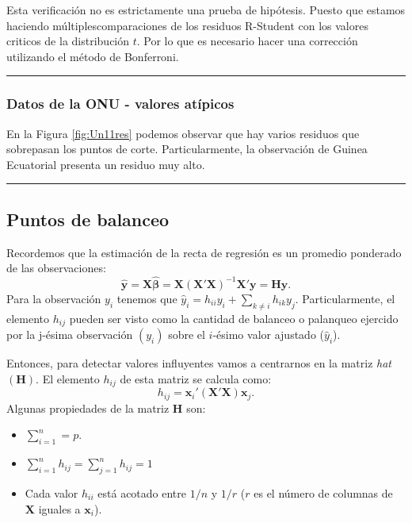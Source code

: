 \documentclass[
]{article}
\begin{document}
Esta verificación no es estrictamente una prueba de hipótesis. Puesto que estamos haciendo múltiplescomparaciones de los residuos R-Student con los valores criticos de la distribución \(t\). Por lo que es necesario hacer una corrección utilizando el método de Bonferroni.

\rule{\textwidth}{0.4pt}

\hypertarget{datos-de-la-onu---valores-atuxedpicos}{%
\subsubsection*{Datos de la ONU - valores atípicos}\label{datos-de-la-onu---valores-atuxedpicos}}

En la Figura \ref{fig:Un11res} podemos observar que hay varios residuos que sobrepasan los puntos de corte. Particularmente, la observación de Guinea Ecuatorial presenta un residuo muy alto.

\rule{\textwidth}{0.4pt}

\hypertarget{puntos-de-balanceo}{%
\subsection{Puntos de balanceo}\label{puntos-de-balanceo}}

Recordemos que la estimación de la recta de regresión es un promedio ponderado de las observaciones:
\[
\widehat{\boldsymbol y}= \boldsymbol X\widehat{\boldsymbol \beta}= \boldsymbol X(\boldsymbol X'\boldsymbol X)^{-1}\boldsymbol X'\boldsymbol y= \boldsymbol H\boldsymbol y.
\]
Para la observación \(y_{i}\) tenemos que \(\widehat{y}_{i} = h_{ii}y_{i} + \sum_{k\neq i}h_{ik}y_{j}\). Particularmente, el elemento \(h_{ij}\) pueden ser visto como la cantidad de balanceo o palanqueo ejercido por la j-ésima observación \((y_i)\) sobre el \(i\)-ésimo valor ajustado (\(\widehat{y}_{i}\)).

Entonces, para detectar valores influyentes vamos a centrarnos en la matriz \textit{hat} \((\boldsymbol H)\). El elemento \(h_{ij}\) de esta matriz se calcula como:
\begin{equation}
h_{ij} = \boldsymbol x_{i}'(\boldsymbol X'\boldsymbol X)\boldsymbol x_{j}.
\label{eq:hij}
\end{equation}
Algunas propiedades de la matriz \(\boldsymbol H\) son:

\begin{itemize}
\item $\sum_{i=1}^{n} = p$.
\item $\sum_{i=1}^{n}h_{ij} = \sum_{j=1}^{n}h_{ij} = 1$
\item Cada valor $h_{ii}$ está acotado entre $1/n$ y $1/r$ ($r$ es el número de columnas de $\boldsymbol X$ iguales a $\boldsymbol x_{i}$).
\end{itemize}
\end{document}
